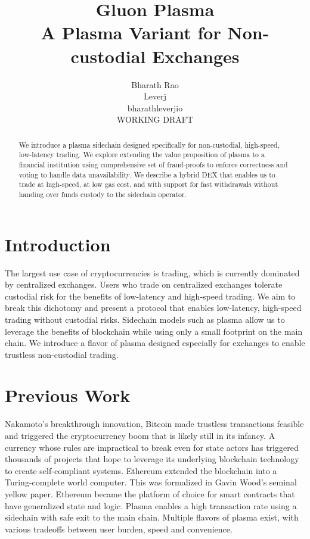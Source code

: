 \documentclass[12pt,a4paper]{article}
\title{Gluon Plasma \\
\large A Plasma Variant for Non-custodial Exchanges}
\author{Bharath Rao \\ 
Leverj\\
bharath\svgat leverj\svgperiod io \\
\tiny WORKING DRAFT}
\begin{document}
\maketitle

\begin{abstract}

        We introduce a plasma sidechain designed specifically for non-custodial, high-speed, low-latency trading. We explore extending the value proposition of plasma to a financial institution using comprehensive set of fraud-proofs to enforce correctness and voting to handle data unavailability. We describe a hybrid DEX that enables us to trade at high-speed, at low gas cost, and with support for fast withdrawals without handing over funds custody to the sidechain operator. 
\end{abstract}

\section{Introduction}

The largest use case of cryptocurrencies is trading, which is currently dominated by centralized exchanges. Users who trade on centralized exchanges tolerate custodial risk for the benefits of low-latency and high-speed trading. We aim to break this dichotomy and present a protocol that enables low-latency, high-speed trading without custodial risks. 
Sidechain models such as plasma allow us to leverage the benefits of blockchain while using only a small footprint on the main chain. We introduce a flavor of plasma designed especially for exchanges to enable trustless non-custodial trading.

\section{Previous Work}

Nakamoto’s breakthrough innovation, Bitcoin\cite{Nak09} made trustless transactions feasible and triggered the cryptocurrency boom that is likely still in its infancy. A currency whose rules are impractical to break even for state actors has triggered thousands of projects that hope to leverage its underlying blockchain technology to create self-compliant systems. 
Ethereum\cite{Eth14} extended the blockchain into a Turing-complete world computer. This was formalized in Gavin Wood’s seminal yellow paper\cite{Gav15}. Ethereum became the platform of choice for smart contracts that have generalized state and logic. Plasma\cite{PB17} enables a high transaction rate using a sidechain with safe exit to the main chain. Multiple flavors of plasma exist, with various tradeoffs between user burden, speed and convenience.
\end{document}
